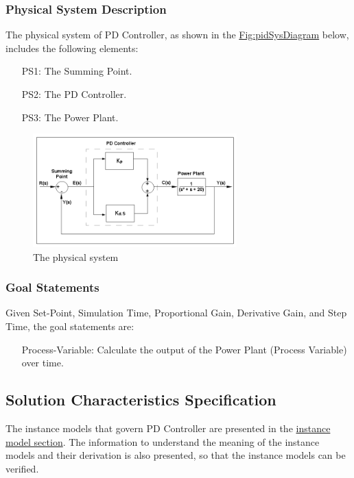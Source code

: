 \documentclass[12pt]{article}
\begin{document}
\subsubsection{Physical System Description}
\label{Sec:PhysSyst}
The physical system of PD Controller, as shown in the \hyperref[Figure:pidSysDiagram]{Fig:pidSysDiagram} below, includes the following elements:

\begin{itemize}
\item[PS1:]{The Summing Point.}
\item[PS2:]{The PD Controller.}
\item[PS3:]{The Power Plant.}
\end{itemize}
\begin{figure}
\begin{center}
\includegraphics[width=0.7\textwidth]{../../../datafiles/PDController/Fig_PDController.png}
\caption{The physical system}
\label{Figure:pidSysDiagram}
\end{center}
\end{figure}
\subsubsection{Goal Statements}
\label{Sec:GoalStmt}
Given Set-Point, Simulation Time, Proportional Gain, Derivative Gain, and Step Time, the goal statements are:

\begin{itemize}
\item[Process-Variable:\phantomsection\label{processVariable}]{Calculate the output of the Power Plant (Process Variable) over time.}
\end{itemize}
\subsection{Solution Characteristics Specification}
\label{Sec:SolCharSpec}
The instance models that govern PD Controller are presented in the \hyperref[Sec:IMs]{instance model section}. The information to understand the meaning of the instance models and their derivation is also presented, so that the instance models can be verified.
\end{document}

